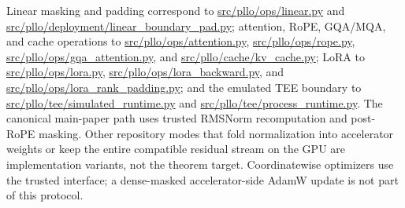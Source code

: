 Linear masking and padding correspond to \url{src/pllo/ops/linear.py} and
\url{src/pllo/deployment/linear_boundary_pad.py}; attention, RoPE, GQA/MQA, and
cache operations to \url{src/pllo/ops/attention.py},
\url{src/pllo/ops/rope.py}, \url{src/pllo/ops/gqa_attention.py}, and
\url{src/pllo/cache/kv_cache.py}; LoRA to \url{src/pllo/ops/lora.py},
\url{src/pllo/ops/lora_backward.py}, and
\url{src/pllo/ops/lora_rank_padding.py}; and the emulated TEE boundary to
\url{src/pllo/tee/simulated_runtime.py} and
\url{src/pllo/tee/process_runtime.py}. The canonical
main-paper path uses trusted RMSNorm recomputation and post-RoPE masking. Other
repository modes that fold normalization into accelerator weights or keep the
entire compatible residual stream on the GPU are implementation variants, not
the theorem target. Coordinatewise optimizers use the trusted interface; a
dense-masked accelerator-side AdamW update is not part of this protocol.
